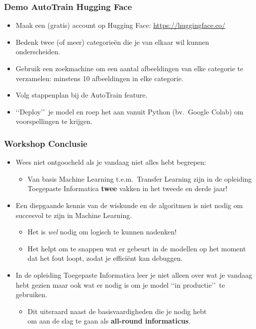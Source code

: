 \documentclass[aspectratio=169]{beamer}
\begin{document}
\begin{frame}
\frametitle{Demo AutoTrain Hugging Face}
\begin{itemize}
\item Maak een (gratis) account op Hugging Face: \url{https://huggingface.co/}
\item Bedenk twee (of meer) categorie\"en die je van elkaar wil kunnen onderscheiden.
\item  Gebruik een zoekmachine om een aantal afbeeldingen van 
elke categorie te verzamelen: minstens 10 afbeeldingen in elke categorie.
\item Volg stappenplan bij de AutoTrain feature.
\item \lq\lq Deploy\rq\rq\ je model en roep het aan vanuit Python (bv.\ Google Colab) om voorspellingen 
te krijgen.
\end{itemize}
\end{frame}


%

\begin{frame}
\frametitle{Workshop Conclusie}
\begin{itemize}
\item Wees niet ontgoocheld als je vandaag niet alles hebt begrepen:
\begin{itemize}
	\item Van basis Machine Learning t.e.m.\ Transfer Learning zijn in de opleiding Toegepaste Informatica \textbf{twee} vakken in het tweede en derde jaar!
\end{itemize}
\item Een diepgaande kennis van de wiskunde en de algoritmen is niet nodig om succesvol te zijn in Machine Learning.
\begin{itemize}
	\item Het is \emph{wel}\/ nodig om logisch te kunnen nadenken!
	\item Het helpt om te snappen wat er gebeurt in de modellen op het moment dat het fout loopt, zodat je effici\"ent kan 
	debuggen.
\end{itemize}
\item In de opleiding Toegepaste Informatica leer je niet alleen over wat je vandaag hebt gezien maar ook 
wat er nodig is om je model \lq\lq in productie\rq\rq\ te gebruiken.
\begin{itemize}
	\item Dit uiteraard naast de basisvaardigheden die je nodig hebt\\ om aan de slag te gaan
	 als \textbf{all-round informaticus}.
\end{itemize}
\end{itemize}
\end{frame}
\end{document}
